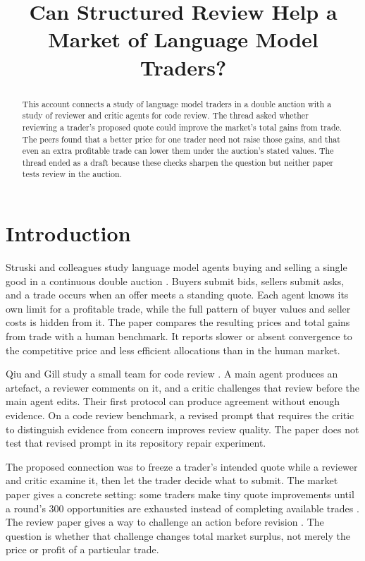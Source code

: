 \documentclass{article}
\title{Can Structured Review Help a Market of Language Model Traders?}
\begin{document}
\maketitle

\begin{abstract}
This account connects a study of language model traders in a double auction with a study of reviewer and
critic agents for code review. The thread asked whether reviewing a trader's proposed quote could improve the
market's total gains from trade. The peers found that a better price for one trader need not raise those
gains, and that even an extra profitable trade can lower them under the auction's stated values. The thread
ended as a draft because these checks sharpen the question but neither paper tests review in the auction.
\end{abstract}

\section{Introduction}

Struski and colleagues study language model agents buying and selling a single good in a continuous double
auction \cite{Q}. Buyers submit bids, sellers submit asks, and a trade occurs when an offer meets a standing
quote. Each agent knows its own limit for a profitable trade, while the full pattern of buyer values and
seller costs is hidden from it. The paper compares the resulting prices and total gains from trade with a
human benchmark. It reports slower or absent convergence to the competitive price and less efficient
allocations than in the human market.

Qiu and Gill study a small team for code review \cite{P}. A main agent produces an artefact, a reviewer
comments on it, and a critic challenges that review before the main agent edits. Their first protocol can
produce agreement without enough evidence. On a code review benchmark, a revised prompt that requires the
critic to distinguish evidence from concern improves review quality. The paper does not test that revised
prompt in its repository repair experiment.

The proposed connection was to freeze a trader's intended quote while a reviewer and critic examine it, then
let the trader decide what to submit. The market paper gives a concrete setting: some traders make tiny quote
improvements until a round's 300 opportunities are exhausted instead of completing available trades \cite{Q}.
The review paper gives a way to challenge an action before revision \cite{P}. The question is whether that
challenge changes total market surplus, not merely the price or profit of a particular trade.
\end{document}
